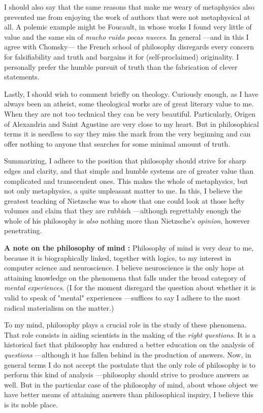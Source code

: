 \documentclass[a4paper]{article}
\begin{document}
I should also say that the same reasons that make me weary of metaphysics also
prevented me from enjoying the work of authors that were not metaphysical at
all. A polemic example might be Foucault, in whose works I found very little of
value and the same sin of \textit{mucho ruido pocas nueces}. In general ---and
in this I agree with Chomsky--- the French school of philosophy disregards every
concern for falsifiability and truth and bargains it for (self-proclaimed)
originality. I personally prefer the humble pursuit of truth than the
fabrication of clever statements.

Lastly, I should wish to comment briefly on theology. Curiously enough, as I
have always been an atheist, some theological works are of great literary value
to me. When they are not too technical they can be very beautiful. Particularly,
Origen of Alexandria and Saint Agustine are very close to my heart. But in
philosophical terms it is needless to say they miss the mark from the very
beginning and can offer nothing to anyone that searches for some minimal amount
of truth.

Summarizing, I adhere to the position that philosophy should strive for sharp
edges and clarity, and that simple and humble systems are of greater value than
complicated and transcendent ones. This makes the whole of metaphysics, but not
only metaphysics, a quite unpleasant matter to me. In this, I believe the
greatest teaching of Nietzsche was to show that one could look at those hefty
volumes and claim that they are rubbish ---although regrettably enough the whole
of his philosophy is \textit{also} nothing more than Nietzsche's
\textit{opinion}, however penetrating.

\textbf{ A note on the philosophy of mind : } Philosophy of mind is very dear to
me, because it is biographically linked, together with logics, to my interest in
computer science and neuroscience. I believe neuroscience is the only hope at
attaining knowledge on the phenomena that falls under the broad category of
\textit{mental experiences}. (I for the moment disregard the question about
whether it is valid to speak of "mental" experiences ---suffices to say I adhere
to the most radical materialism on the matter.)

To my mind, philosophy plays a crucial role in the study of these phenomena.
That role consists in aiding scientists in the making of the \textit{right
questions}. It is a historical fact that philosophy has endured a better
education on the analysis of \textit{questions} ---although it has fallen behind
in the production of answers. Now, in general terms I do not accept the
postulate that the only role of philosophy is to perform this kind of analysis
---philosophy should strive to produce answers as well. But in the particular
case of the philosophy of mind, about whose object we have better means of
attaining answers than philosophical inquiry, I believe this is its noble place.
\end{document}
